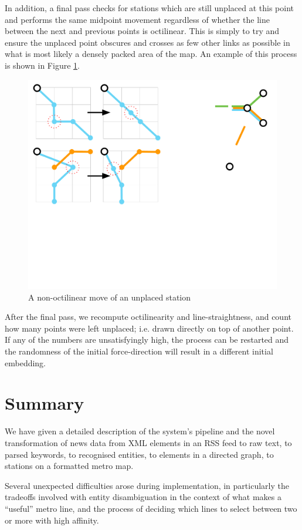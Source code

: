 In addition, a final pass checks for stations which are still unplaced at this point and performs the same midpoint movement regardless of whether the line between the next and previous points is octilinear. This is simply to try and ensure the unplaced point obscures and crosses as few other links as possible in what is most likely a densely packed area of the map. An example of this process is shown in Figure \ref{fig:nonoct}.
\begin{figure}[htbp!]
	\centering
	\includegraphics[width=.7\textwidth]{img/implementation/averagingnonoctilinear.pdf}
	\caption{A non-octilinear move of an unplaced station}
	\label{fig:nonoct}
\end{figure}

After the final pass, we recompute octilinearity and line-straightness, and count how many points were left unplaced; i.e. drawn directly on top of another point. If any of the numbers are unsatisfyingly high, the process can be restarted and the randomness of the initial force-direction will result in a different initial embedding.

\section{Summary}

We have given a detailed description of the system's pipeline and the novel transformation of news data from XML elements in an RSS feed to raw text, to parsed keywords, to recognised entities, to elements in a directed graph, to stations on a formatted metro map.

Several unexpected difficulties arose during implementation, in particularly the tradeoffs involved with entity disambiguation in the context of what makes a ``useful'' metro line, and the process of deciding which lines to select between two or more with high affinity. 

